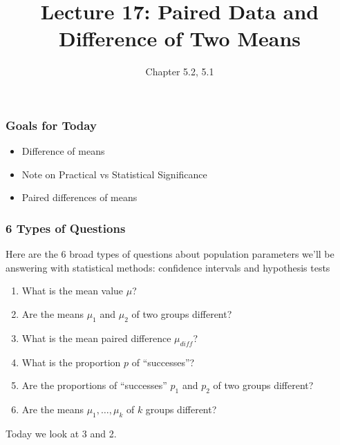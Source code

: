 \documentclass[handout]{beamer}
\title{Lecture 17: Paired Data and Difference of Two Means}
\author{Chapter 5.2, 5.1}
\date{}
\newcommand{\blue}[1]{\textcolor{blue2}{#1}}
\begin{document}
\begin{frame}
\titlepage
\end{frame}


\begin{frame}[fragile]
\frametitle{Goals for Today}

\begin{itemize}
\item Difference of means
\item Note on Practical vs Statistical Significance
\item Paired differences of means
\end{itemize}

\end{frame}


\begin{frame}
\frametitle{6 Types of Questions}

Here are the 6 broad types of questions about \blue{population parameters} we'll be answering with statistical methods:  confidence intervals and hypothesis tests 

\vspace{0.25cm}

\begin{enumerate}
\pause\item What is the mean value $\mu$?
\pause\item Are the means $\mu_1$ and $\mu_2$ of two groups different?
\pause\item What is the mean paired difference $\mu_{diff}$?
\pause\item What is the proportion $p$ of ``successes''?
\pause\item Are the proportions of ``successes'' $p_1$ and $p_2$ of two groups different?
\pause\item Are the means $\mu_1, \ldots, \mu_k$ of $k$ groups different?

\end{enumerate}

\pause Today we look at 3 and 2.
\end{frame}
\end{document}
